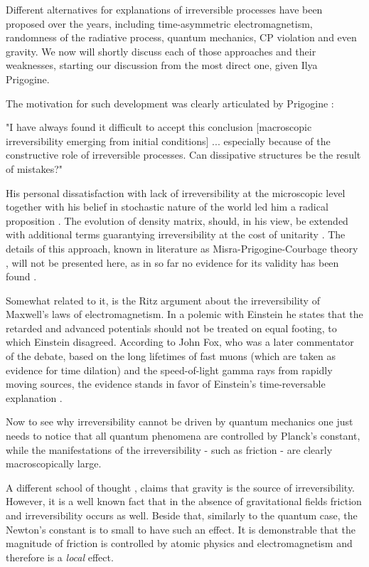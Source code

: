 \documentclass[a4paper,12pt]{article}
\begin{document}
Different alternatives for explanations of irreversible processes have been proposed over the years, including time-asymmetric electromagnetism, randomness of the radiative process, quantum mechanics, CP violation and even gravity. We now will shortly discuss each of those approaches and their weaknesses, starting our discussion from the most direct one, given Ilya Prigogine.

The motivation for such development was clearly articulated by Prigogine \cite{Prigogine:1978kz}:
\begin{displayquote}
"I have always found it difficult to accept this conclusion [macroscopic irreversibility emerging from initial conditions] {...} especially because of the constructive role of irreversible processes. Can dissipative structures be the result of mistakes?"
\end{displayquote}

His personal dissatisfaction with lack of irreversibility at the microscopic level together with his belief in stochastic nature of the world led him a radical proposition \cite{Gustafson:2004kx}.
The evolution of density matrix, should, in his view, be extended with additional terms guarantying irreversibility at the cost of unitarity \cite{Prigogine:1978kz}.
The details of this approach, known in literature as Misra-Prigogine-Courbage theory \cite{Courbage:1983eo}, will not be presented here, as in so far no evidence for its validity has been found \cite{Bricmont:7zJsfTpK}.

Somewhat related to it, is the Ritz argument about the irreversibility of Maxwell's laws of electromagnetism. In a polemic with Einstein he states that the retarded and advanced potentials should not be treated on equal footing, to which Einstein disagreed. 
According to John Fox, who was a later commentator of the debate, based on the long lifetimes of fast muons (which are taken as evidence for time dilation) and the speed-of-light gamma rays from rapidly moving sources, the evidence stands in favor of Einstein's time-reversable explanation \cite{Fox:1965bg}.

Now to see why irreversibility cannot be driven by quantum mechanics one just needs to notice that all quantum phenomena are controlled by Planck's constant, while the manifestations of the irreversibility - such as friction - are clearly macroscopically large. %

A different school of thought \cite{KIEFER2005, Barbour:2014hq}, %
claims that gravity is the source of irreversibility. However, it is a well known fact that in the absence of gravitational fields friction and irreversibility occurs as well. Beside that, similarly to the quantum case, the Newton's constant is to small to have such an effect. It is demonstrable that the magnitude of friction is controlled by atomic physics and electromagnetism and therefore is a \textit{local} effect. 
\end{document}
